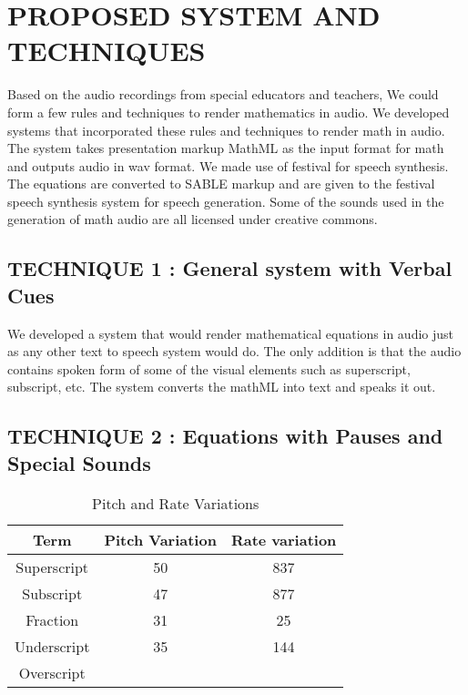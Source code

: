 \documentclass{article}
\begin{document}
\section{PROPOSED SYSTEM AND TECHNIQUES}
\label{sec:majhead}

Based on the audio recordings from special educators and teachers, We could form a few rules and techniques to render mathematics in audio. We developed systems that incorporated these rules and techniques to render math in audio. The system takes presentation markup MathML as the input format for math and outputs audio in wav format. We made use of festival for speech synthesis. The equations are converted to SABLE markup and are given to the festival speech synthesis system for speech generation. Some of the sounds used in the generation of math audio are all licensed under creative commons.



\subsection{TECHNIQUE 1 : General system with Verbal Cues}
\label{ssec:subhead}

We developed a system that would render mathematical equations in audio just as any other text to speech system would do. The only addition is that the audio contains spoken form of some of the visual elements such as superscript, subscript, etc. The system converts the mathML into text and speaks it out.


\subsection{TECHNIQUE 2 : Equations with Pauses and Special Sounds}
\label{ssec:subhead}
\begin{table}[t]
\caption{Pitch and Rate Variations}

\vspace{8pt} %

\centering
\begin{tabular}{c c c }
\hline\hline %
Term & Pitch Variation & Rate variation \\[0.5ex]
\hline
Superscript & 50 & 837  \\
Subscript & 47 & 877  \\
Fraction & 31 & 25  \\
Underscript & 35 & 144  \\
Overscript \\ [1ex]
\hline


\end{tabular}
\end{table}
\end{document}
